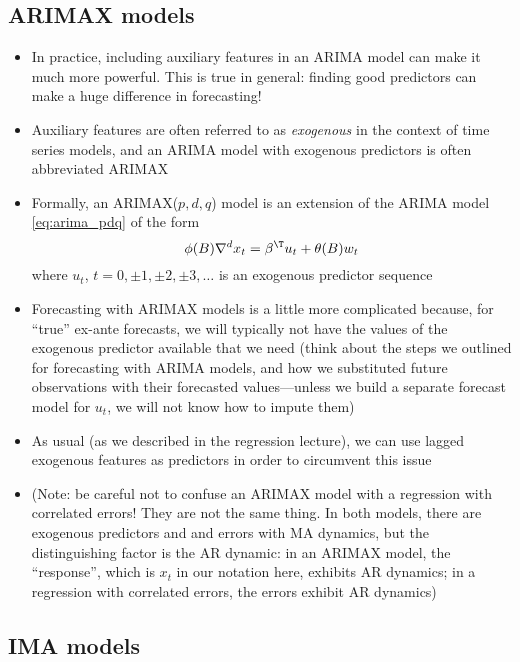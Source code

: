 \documentclass{article}
\begin{document}
\subsection{ARIMAX models}

\begin{itemize}
\item In practice, including auxiliary features in an ARIMA model can make it
  much more powerful. This is true in general: finding good predictors can make
  a huge difference in forecasting!

\item Auxiliary features are often referred to as \emph{exogenous} in the
  context of time series models, and an ARIMA model with exogenous predictors is
  often abbreviated ARIMAX 

\item Formally, an ARIMAX($p,d,q$) model is an extension of the ARIMA model 
  \eqref{eq:arima_pdq} of the form 
  \[
  \phi(B) \nabla^d x_t = \beta^\T u_t + \theta(B) w_t
  \]
  where $u_t$, $t = 0, \pm 1, \pm 2, \pm 3, \dots$ is an exogenous predictor
  sequence 

\item Forecasting with ARIMAX models is a little more complicated because, for
  ``true'' ex-ante forecasts, we will typically not have the values of the
  exogenous predictor available that we need (think about the steps we outlined
  for forecasting with ARIMA models, and how we substituted future observations
  with their forecasted values---unless we build a separate forecast model for
  $u_t$, we will not know how to impute them) 

\item As usual (as we described in the regression lecture), we can use lagged
  exogenous features as predictors in order to circumvent this issue

\item (Note: be careful not to confuse an ARIMAX model with a regression with 
  correlated errors! They are not the same thing. In both models, there are
  exogenous predictors and and errors with MA dynamics, but the distinguishing  
  factor is the AR dynamic: in an ARIMAX model, the ``response'', which is $x_t$
  in our notation here, exhibits AR dynamics; in a regression with correlated
  errors, the errors exhibit AR dynamics) 
\end{itemize}

\subsection{IMA models}
\end{document}
